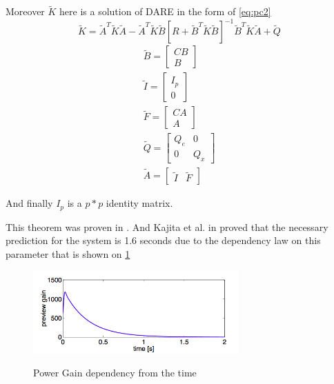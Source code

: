 \documentclass[12pt,a4paper]{report}
\begin{document}
			Moreover $\tilde{K}$ here is a solution of DARE in the form of \ref{eq:pc2}
			\begin{equation}\label{eq:pc2}
				\tilde{K} = \tilde{A}^T\tilde{K}\tilde{A} - \tilde{A}^T \tilde{K} \tilde{B} [R + \tilde{B}^T \tilde{K} \tilde{B}]^{-1} \tilde{B}^T\tilde{K}\tilde{A} + \tilde{Q}
			\end{equation}
			\begin{equation}\label{eq:pc3}
				\begin{split}
					\tilde{B} = \begin{bmatrix} C B \\ B \end{bmatrix}\\
					\tilde{I} = \begin{bmatrix} I_p \\ 0 \end{bmatrix}\\
					\tilde{F} = \begin{bmatrix} CA \\ A \end{bmatrix}\\
					\tilde{Q} = \begin{bmatrix} Q_e & 0 \\ 0 & Q_x \end{bmatrix}\\
					\tilde{A} = \begin{bmatrix} \tilde{I} & \tilde{F} \end{bmatrix}
				\end{split}
			\end{equation}
			
			And finally $I_p$ is a $p * p$ identity matrix.
			
			This theorem was proven in \cite{katayama1985design}. And Kajita et al. in \cite{kajita2003biped} proved that the necessary prediction for the system is 1.6 seconds due to the dependency law on this parameter that is shown on \cref{fig:12} 
			
			\begin{figure}[H]
				\vspace{-0.2cm}
				\centering
				{\includegraphics[width=0.7\textwidth]{12}}
				\caption{Power Gain dependency from the time \cite{kajita2003biped}}
				\label{fig:12}
				\vspace{-0.1cm}
			\end{figure}
			
\end{document}
